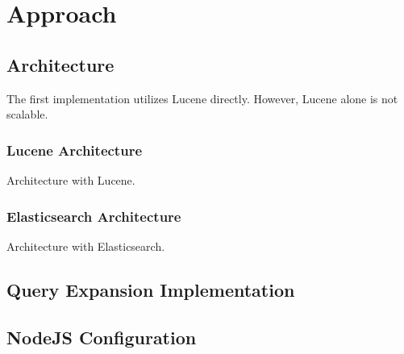 \chapter{Approach}
\label{ch:approach}

\section{Architecture}
The first implementation utilizes Lucene directly.
However, Lucene alone is not scalable.

\subsection{Lucene Architecture}
Architecture with Lucene.

\subsection{Elasticsearch Architecture}
Architecture with Elasticsearch.

\section{Query Expansion Implementation}

\section{NodeJS Configuration}
